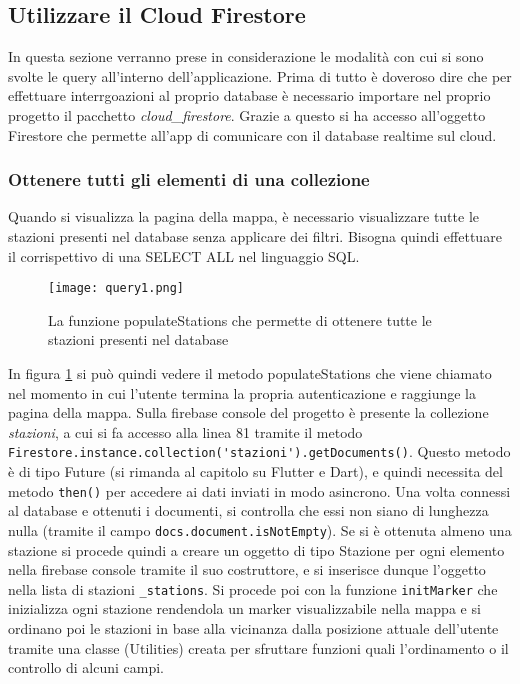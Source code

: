 \subsection{Utilizzare il Cloud Firestore}
In questa sezione verranno prese in considerazione le modalità con cui si sono
svolte le query all'interno dell'applicazione. Prima di tutto è doveroso dire
che per effettuare interrgoazioni al proprio database è necessario importare nel
proprio progetto il pacchetto \textit{cloud\_firestore}. Grazie a questo si ha
accesso all'oggetto Firestore che permette all'app di comunicare con il database
realtime sul cloud.
\subsubsection{Ottenere tutti gli elementi di una collezione}
Quando si visualizza la pagina della mappa, è necessario visualizzare tutte le
stazioni presenti nel database senza applicare dei filtri. Bisogna quindi
effettuare il corrispettivo di una SELECT ALL nel linguaggio SQL. 
\begin{figure}[!h]
    \centering
    \texttt{[image: query1.png]}
    \caption{La funzione populateStations che permette di ottenere tutte le stazioni presenti nel database}
    \label{query1}
\end{figure}
In figura \ref{query1} si può quindi vedere il metodo populateStations che viene
chiamato nel momento in cui l'utente termina la propria autenticazione e
raggiunge la pagina della mappa. Sulla firebase console del progetto è presente
la collezione \textit{stazioni}, a cui si fa accesso alla linea 81 tramite il
metodo \verb|Firestore.instance.collection('stazioni').getDocuments()|. Questo
metodo è di tipo Future (si rimanda al capitolo su Flutter e Dart), e quindi
necessita del metodo \verb|then()| per accedere ai dati inviati in modo
asincrono. Una volta connessi al database e ottenuti i documenti, si controlla
che essi non siano di lunghezza nulla (tramite il campo
\verb|docs.document.isNotEmpty|). Se si è ottenuta almeno una stazione si
procede quindi a creare un oggetto di tipo Stazione per ogni elemento nella
firebase console tramite il suo costruttore, e si inserisce dunque l'oggetto
nella lista di stazioni \verb|_stations|. Si procede poi con la funzione
\verb|initMarker| che inizializza ogni stazione rendendola un marker
visualizzabile nella mappa e si ordinano poi le stazioni in base alla vicinanza
dalla posizione attuale dell'utente tramite una classe (Utilities) creata per
sfruttare funzioni quali l'ordinamento o il controllo di alcuni campi.


